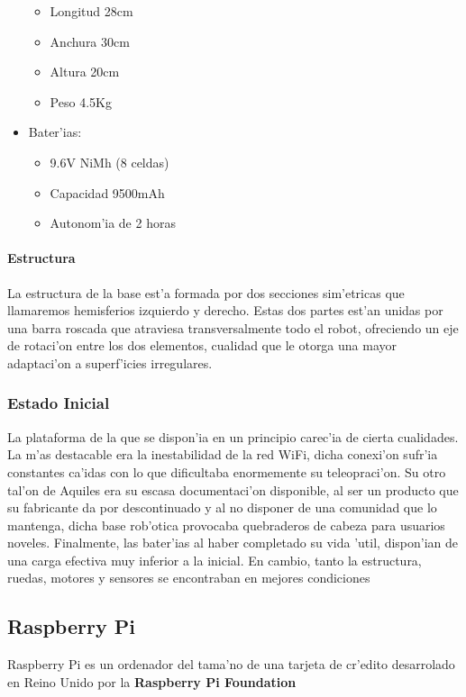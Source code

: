\documentclass[twoside,12pt]{article}
\begin{document}
\begin{multicols}{2}
\begin{itemize}
\begin{itemize}
	\item Longitud 28cm
	\item Anchura 30cm
	\item Altura 20cm
	\item Peso 4.5Kg
	\end{itemize}
\item Bater'ias:
	\begin{itemize}
	\item 9.6V NiMh (8 celdas)
	\item Capacidad 9500mAh
	\item Autonom'ia de 2 horas
	\end{itemize}
\end{itemize}
\end{multicols}

\paragraph{Estructura}\noindent

La estructura de la base est'a formada por dos secciones sim'etricas que llamaremos hemisferios izquierdo y derecho. Estas dos partes est'an unidas por una barra roscada que atraviesa transversalmente todo el robot, ofreciendo un eje de rotaci'on entre los dos elementos, cualidad que le otorga una mayor adaptaci'on a superf'icies irregulares.

\subsubsection{Estado Inicial}  
La plataforma de la que se dispon'ia en un principio carec'ia de cierta cualidades. La m'as destacable era la inestabilidad de la red WiFi, dicha conexi'on sufr'ia constantes ca'idas con lo que dificultaba enormemente su teleopraci'on. Su otro tal'on de Aquiles era su escasa documentaci'on disponible, al ser un producto que su fabricante da por descontinuado y al no disponer de una comunidad que lo mantenga, dicha base rob'otica provocaba quebraderos de cabeza para usuarios noveles. Finalmente, las bater'ias al haber completado su vida 'util, dispon'ian de una carga efectiva muy inferior a la inicial. En cambio, tanto la estructura, ruedas, motores y sensores se encontraban en mejores condiciones

\subsection{Raspberry Pi}
Raspberry Pi es un ordenador del tama'no de una tarjeta de cr'edito desarrolado en Reino Unido por la \textbf{Raspberry Pi Foundation}
\newpage
\end{document}
